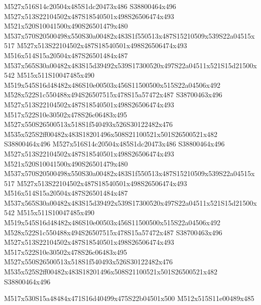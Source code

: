 \documentclass{article}
\begin{document}
\begin{multicols}{2}
M527x516S14c20504x485S1dc20473x486 S38800464x496 M527x513S22104502x487S18540501x498S26506474x493 M521x520S10041500x490S26501479x480 M537x570S20500498x550S30a00482x483S1f550513x487S15210509x539S22a04515x517 M527x513S22104502x487S18540501x498S26506474x493 M516x514S15a20504x487S26501484x487 M537x565S30a00482x483S15d39492x539S17300520x497S22a04511x521S15d21500x542 M515x511S10047485x490 M519x545S16d48482x486S10e00503x456S11500500x515S22a04506x492 M528x522S1c550488x494S26507515x478S15a57472x487 S38700463x496 M527x513S22104502x487S18540501x498S26506474x493 M517x522S10e30502x478S26c06483x495 M527x550S26500513x518S1f540493x526S30122482x476 M535x525S2ff00482x483S18201496x508S21100521x501S26500521x482 S38800464x496
M527x516S14c20504x485S1dc20473x486 S38800464x496 M527x513S22104502x487S18540501x498S26506474x493 M521x520S10041500x490S26501479x480 M537x570S20500498x550S30a00482x483S1f550513x487S15210509x539S22a04515x517 M527x513S22104502x487S18540501x498S26506474x493 M516x514S15a20504x487S26501484x487 M537x565S30a00482x483S15d39492x539S17300520x497S22a04511x521S15d21500x542 M515x511S10047485x490 M519x545S16d48482x486S10e00503x456S11500500x515S22a04506x492 M528x522S1c550488x494S26507515x478S15a57472x487 S38700463x496 M527x513S22104502x487S18540501x498S26506474x493 M517x522S10e30502x478S26c06483x495 M527x550S26500513x518S1f540493x526S30122482x476 M535x525S2ff00482x483S18201496x508S21100521x501S26500521x482 S38800464x496

\begin{center}
M517x530S15a48484x471S16d40499x475S22b04501x500 M512x515S11e00489x485 
\end{center}



\end{multicols}
\end{document}
